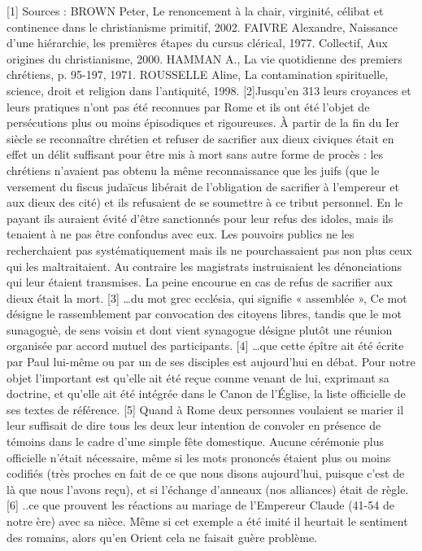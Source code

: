 [1] Sources : BROWN Peter, Le renoncement à la chair, virginité, célibat et continence dans le christianisme primitif, 2002. FAIVRE Alexandre, Naissance d'une hiérarchie, les premières étapes du cursus clérical, 1977. Collectif, Aux origines du christianisme, 2000. HAMMAN A., La vie quotidienne des premiers chrétiens, p. 95-197, 1971. ROUSSELLE Aline, La contamination spirituelle, science, droit et religion dans l'antiquité, 1998.
[2]Jusqu'en 313 leurs croyances et leurs pratiques n'ont pas été reconnues par Rome et ils ont été l'objet de persécutions plus ou moins épisodiques et rigoureuses. À partir de la fin du Ier siècle se reconnaître chrétien et refuser de sacrifier aux dieux civiques était en effet un délit suffisant pour être mis à mort sans autre forme de procès : les chrétiens n'avaient pas obtenu la même reconnaissance que les juifs (que le versement du fiscus judaïcus libérait de l'obligation de sacrifier à l'empereur et aux dieux des cité) et ils refusaient de se soumettre à ce tribut personnel. En le payant ils auraient évité d'être sanctionnés pour leur refus des idoles, mais ils tenaient à ne pas être confondus avec eux. Les pouvoirs publics ne les recherchaient pas systématiquement mais ils ne pourchassaient pas non plus ceux qui les maltraitaient. Au contraire les magistrats instruisaient les dénonciations qui leur étaient transmises. La peine encourue en cas de refus de sacrifier aux dieux était la mort. 
[3] …du mot grec ecclésia, qui signifie « assemblée », Ce mot désigne le rassemblement par convocation des citoyens libres, tandis que le mot sunagoguè, de sens voisin et dont vient synagogue désigne plutôt une réunion organisée par accord mutuel des participants.
[4] …que cette épître ait été écrite par Paul lui-même ou par un de ses disciples est aujourd'hui en débat. Pour notre objet l'important est qu'elle ait été reçue comme venant de lui, exprimant sa doctrine, et qu'elle ait été intégrée dans le Canon de l'Église, la liste officielle de ses textes de référence.
[5] Quand à Rome deux personnes voulaient se marier il leur suffisait de dire tous les deux leur intention de convoler en présence de témoins dans le cadre d'une simple fête domestique. Aucune cérémonie plus officielle n'était nécessaire, même si les mots prononcés étaient plus ou moins codifiés (très proches en fait de ce que nous disons aujourd'hui, puisque c'est de là que nous l'avons reçu), et si l'échange d'anneaux (nos alliances) était de règle.
[6] ..ce que prouvent les réactions au mariage de l'Empereur Claude (41-54 de notre ère) avec sa nièce. Même si cet exemple a été imité il heurtait le sentiment des romains, alors qu'en Orient cela ne faisait guère problème.
